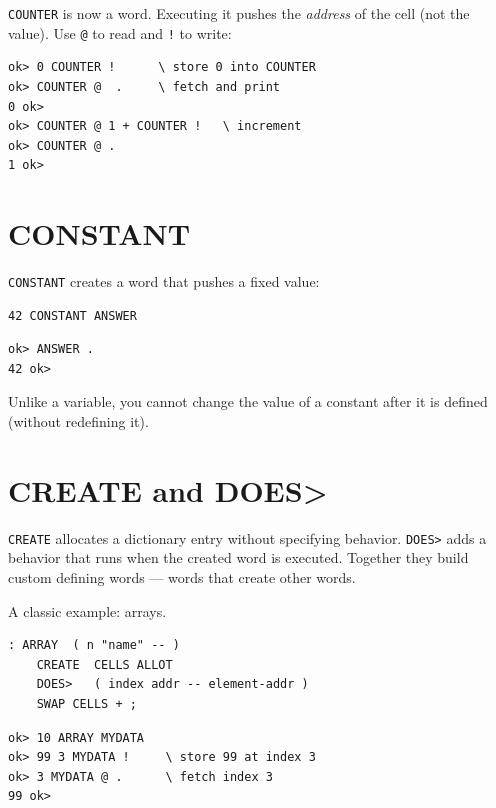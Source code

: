 \texttt{COUNTER} is now a word. Executing it pushes the \emph{address} of the
cell (not the value). Use \texttt{@} to read and \texttt{!} to write:

\begin{lstlisting}[language=Forth]
ok> 0 COUNTER !      \ store 0 into COUNTER
ok> COUNTER @  .     \ fetch and print
0 ok>
ok> COUNTER @ 1 + COUNTER !   \ increment
ok> COUNTER @ .
1 ok>
\end{lstlisting}

\section{CONSTANT}
\label{sec:constant}

\texttt{CONSTANT} creates a word that pushes a fixed value:

\begin{lstlisting}[language=Forth]
42 CONSTANT ANSWER
\end{lstlisting}

\begin{lstlisting}[language=Forth]
ok> ANSWER .
42 ok>
\end{lstlisting}

Unlike a variable, you cannot change the value of a constant after it is
defined (without redefining it).

\section{CREATE and DOES>}
\label{sec:create-does}

\texttt{CREATE} allocates a dictionary entry without specifying behavior.
\texttt{DOES>} adds a behavior that runs when the created word is executed.
Together they build custom defining words --- words that create other words.

A classic example: arrays.

\begin{lstlisting}[language=Forth]
: ARRAY  ( n "name" -- )
    CREATE  CELLS ALLOT
    DOES>   ( index addr -- element-addr )
    SWAP CELLS + ;
\end{lstlisting}

\begin{lstlisting}[language=Forth]
ok> 10 ARRAY MYDATA
ok> 99 3 MYDATA !     \ store 99 at index 3
ok> 3 MYDATA @ .      \ fetch index 3
99 ok>
\end{lstlisting}

